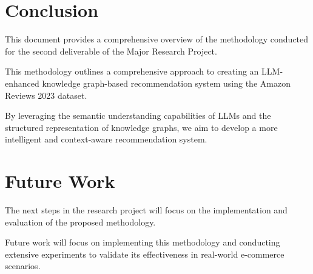 \documentclass{article}
\begin{document}


\section{Conclusion}

This document provides a comprehensive overview of the methodology conducted for the second deliverable of the Major Research Project.

This methodology outlines a comprehensive approach to creating an LLM-enhanced knowledge graph-based recommendation system using the Amazon Reviews 2023 dataset. 

By leveraging the semantic understanding capabilities of LLMs and the structured representation of knowledge graphs, we aim to develop a more intelligent and context-aware recommendation system.


\section{Future Work}

The next steps in the research project will focus on the implementation and evaluation of the proposed methodology. 

Future work will focus on implementing this methodology and conducting extensive experiments to validate its effectiveness in real-world e-commerce scenarios.

\printbibliography
\clearpage

\appendix
\end{document}
